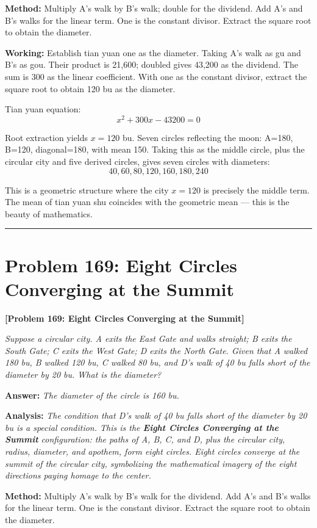 \documentclass[11pt,a4paper]{book}
\newcommand{\answer}[1]{\noindent\textbf{\color{anacolor}Answer: }\textit{#1}\par}
\newcommand{\method}[1]{\noindent\textbf{\color{methodcolor}Method: }#1\par}
\newcommand{\working}[1]{\noindent\textbf{\color{workcolor}Working: }#1\par}
\newcommand{\analysis}[1]{\noindent\textbf{\color{anacolor}Analysis: }\textit{#1}\par}
\newcommand{\shortline}{\noindent\rule{0.5\textwidth}{0.4pt}\par}
\begin{document}
\method{Multiply A's walk by B's walk; double for the dividend. Add A's and B's walks for the linear term. One is the constant divisor. Extract the square root to obtain the diameter.}

\working{Establish tian yuan one as the diameter. Taking A's walk as gu and B's as gou. Their product is 21,600; doubled gives 43,200 as the dividend. The sum is 300 as the linear coefficient. With one as the constant divisor, extract the square root to obtain 120 bu as the diameter.

Tian yuan equation:
$$x^2 + 300x - 43200 = 0$$

Root extraction yields $x = 120$ bu. Seven circles reflecting the moon: A=180, B=120, diagonal=180, with mean 150. Taking this as the middle circle, plus the circular city and five derived circles, gives seven circles with diameters:
$$40, 60, 80, 120, 160, 180, 240$$

This is a geometric structure where the city $x = 120$ is precisely the middle term. The mean of tian yuan shu coincides with the geometric mean --- this is the beauty of mathematics.}

\shortline

\section{Problem 169: Eight Circles Converging at the Summit}
\label{sec:prob169}

\noindent\textbf{\color{probcolor}[Problem 169: Eight Circles Converging at the Summit]}

\textit{Suppose a circular city. A exits the East Gate and walks straight; B exits the South Gate; C exits the West Gate; D exits the North Gate. Given that A walked 180 bu, B walked 120 bu, C walked 80 bu, and D's walk of 40 bu falls short of the diameter by 20 bu. What is the diameter?}

\answer{The diameter of the circle is 160 bu.}

\analysis{The condition that D's walk of 40 bu falls short of the diameter by 20 bu is a special condition. This is the \textbf{Eight Circles Converging at the Summit} configuration: the paths of A, B, C, and D, plus the circular city, radius, diameter, and apothem, form eight circles. Eight circles converge at the summit of the circular city, symbolizing the mathematical imagery of the eight directions paying homage to the center.}

\method{Multiply A's walk by B's walk for the dividend. Add A's and B's walks for the linear term. One is the constant divisor. Extract the square root to obtain the diameter.}
\end{document}
